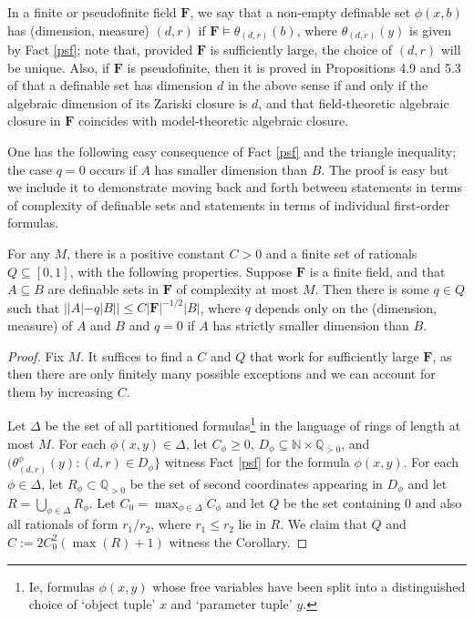 \documentclass[10pt]{article}
\begin{document}
{In a finite or pseudofinite field $\mathbf{F}$, we say that a non-empty definable set $\phi(x,b)$ has (dimension, measure) $(d,r)$ if $\mathbf{F}\models\theta_{(d,r)}(b)$, where $\theta_{(d,r)}(y)$ is given by Fact \ref{psf}; note that, provided $\mathbf{F}$ is sufficiently large, the choice of $(d,r)$ will be unique. Also, if $\mathbf{F}$ is pseudofinite, then it is proved in Propositions 4.9 and 5.3 of \cite{chatzidakis_vdd_macintyre} that a definable set has dimension $d$ in the above sense if and only if the algebraic dimension of its Zariski closure is $d$, and that field-theoretic algebraic closure in $\mathbf{F}$ coincides with model-theoretic algebraic closure.

One has the following easy consequence of Fact \ref{psf} and the triangle inequality; the case $q=0$ occurs if $A$ has smaller dimension than $B$. The proof is easy but we include it to demonstrate moving back and forth between statements in terms of complexity of definable sets and statements in terms of individual first-order formulas.

\begin{corollary}\label{chatzidakis_same_dimension}
    For any $M$, there is a positive constant $C>0$ and a finite set of rationals $Q\subseteq[0,1]$, with the following properties. Suppose $\mathbf{F}$ is a finite field, and that $A\subseteq B$ are definable sets in $\mathbf{F}$ of complexity at most $M$. Then there is some $q\in Q$ such that $||A|-q|B||\leqslant C|\mathbf{F}|^{-1/2}|B|$, where $q$ depends only on the (dimension, measure) of $A$ and $B$ and $q=0$ if $A$ has strictly smaller dimension than $B$.
\end{corollary}
\begin{proof}
    Fix $M$. It suffices to find a $C$ and $Q$ that work for sufficiently large $\mathbf{F}$, as then there are only finitely many possible exceptions and we can account for them by increasing $C$.

    Let $\Delta$ be the set of all partitioned formulas\footnote[1]{Ie, formulas $\phi(x,y)$ whose free variables have been split into a distinguished choice of `object tuple' $x$ and `parameter tuple' $y$.} in the language of rings of length at most $M$. For each $\phi(x,y)\in\Delta$, let $C_\phi\geqslant 0$, $D_\phi\subseteq\mathbb{N}\times\mathbb{Q}_{>0}$, and $(\theta_{(d,r)}^\phi(y):(d,r)\in D_\phi\}$ witness Fact \ref{psf} for the formula $\phi(x,y)$. For each $\phi\in\Delta$, let $R_\phi\subset\mathbb{Q}_{>0}$ be the set of second coordinates appearing in $D_\phi$ and let $R=\bigcup_{\phi\in\Delta}R_\phi$. Let $C_0=\max_{\phi\in\Delta}C_\phi$ and let $Q$ be the set containing $0$ and also all rationals of form $r_1/r_2$, where $r_1\leqslant r_2$ lie in $R$. We claim that $Q$ and $C:=2C_0^2(\max(R)+1)$ witness the Corollary.


\end{proof}}
\end{document}
